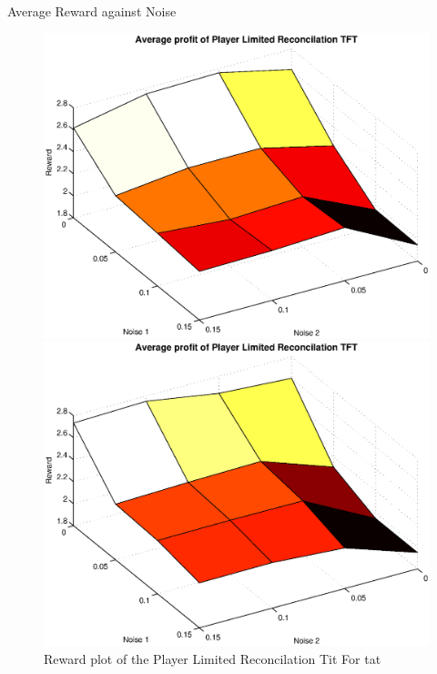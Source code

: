 Average Reward against Noise

\begin{figure}[h]

\begin{minipage}[hbt]{0.65\textwidth}
	\centering
	\includegraphics[width=\textwidth]{pics/simulation1/Reward_vs_Noise_of_Player_Limited_Reconcilation_TFT}
\end{minipage}
\hfill
\begin{minipage}[hbt]{0.3\textwidth}
	\centering
	\includegraphics[width=\textwidth]{pics/simulation2/Reward_vs_Noise_of_Player_Limited_Reconcilation_TFT}
\end{minipage}
	\caption{Reward plot of the Player Limited Reconcilation Tit For tat}
	\label{pic player lrtft}
\end{figure}


